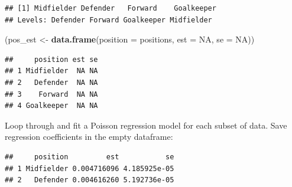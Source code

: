 \documentclass[]{book}
\makeatletter
\newenvironment{Shaded}{\begin{snugshade}}{\end{snugshade}}
\newcommand{\KeywordTok}[1]{\textcolor[rgb]{0.13,0.29,0.53}{\textbf{#1}}}
\newcommand{\DataTypeTok}[1]{\textcolor[rgb]{0.13,0.29,0.53}{#1}}
\newcommand{\DecValTok}[1]{\textcolor[rgb]{0.00,0.00,0.81}{#1}}
\newcommand{\StringTok}[1]{\textcolor[rgb]{0.31,0.60,0.02}{#1}}
\newcommand{\OtherTok}[1]{\textcolor[rgb]{0.56,0.35,0.01}{#1}}
\newcommand{\ControlFlowTok}[1]{\textcolor[rgb]{0.13,0.29,0.53}{\textbf{#1}}}
\newcommand{\OperatorTok}[1]{\textcolor[rgb]{0.81,0.36,0.00}{\textbf{#1}}}
\newcommand{\NormalTok}[1]{#1}
\newenvironment{kframe}{%
\medskip{}
\setlength{\fboxsep}{.8em}
 \def\at@end@of@kframe{}%
 \ifinner\ifhmode%
  \def\at@end@of@kframe{\end{minipage}}%
  \begin{minipage}{\columnwidth}%
 \fi\fi%
 \def\FrameCommand##1{\hskip\@totalleftmargin \hskip-\fboxsep
 \colorbox{shadecolor}{##1}\hskip-\fboxsep
     \hskip-\linewidth \hskip-\@totalleftmargin \hskip\columnwidth}%
 \MakeFramed {\advance\hsize-\width
   \@totalleftmargin\z@ \linewidth\hsize
   \@setminipage}}%
 {\par\unskip\endMakeFramed%
 \at@end@of@kframe}
\renewenvironment{Shaded}{\begin{kframe}}{\end{kframe}}
\theoremstyle{definition}
\theoremstyle{definition}
\theoremstyle{definition}
\theoremstyle{remark}
\makeatother
\begin{document}
\begin{verbatim}
## [1] Midfielder Defender   Forward    Goalkeeper
## Levels: Defender Forward Goalkeeper Midfielder
\end{verbatim}

\begin{Shaded}
\begin{Highlighting}[]
\NormalTok{(pos_est <-}\StringTok{ }\KeywordTok{data.frame}\NormalTok{(}\DataTypeTok{position =}\NormalTok{ positions,}
                       \DataTypeTok{est =} \OtherTok{NA}\NormalTok{, }\DataTypeTok{se =} \OtherTok{NA}\NormalTok{))}
\end{Highlighting}
\end{Shaded}

\begin{verbatim}
##     position est se
## 1 Midfielder  NA NA
## 2   Defender  NA NA
## 3    Forward  NA NA
## 4 Goalkeeper  NA NA
\end{verbatim}

Loop through and fit a Poisson regression model for each subset of data.
Save regression coefficients in the empty dataframe:

\begin{Shaded}
\end{Shaded}

\begin{verbatim}
##     position         est           se
## 1 Midfielder 0.004716096 4.185925e-05
## 2   Defender 0.004616260 5.192736e-05
\end{verbatim}
\end{document}

